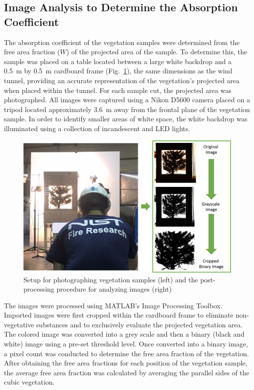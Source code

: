 \documentclass[12pt]{article}
\begin{document}
\subsection{Image Analysis to Determine the Absorption Coefficient }
\label{ssec:headingscap}

The absorption coefficient of the vegetation samples were determined from the free area fraction ($W$) of the projected area of the sample. To determine this, the sample was placed on a table located between a large white backdrop and a 0.5~m by 0.5~m cardboard frame (Fig.~\ref{fig:ImgAnaly}), the same dimensions as the wind tunnel, providing an accurate representation of the vegetation's projected area when placed within the tunnel. For each sample cut, the projected area was photographed. All images were captured using a Nikon D5600 camera placed on a tripod located approximately 3.6~\si{m} away from the frontal plane of the vegetation sample. In order to identify smaller areas of white space, the white backdrop was illuminated using a collection of incandescent and LED lights.

\begin{figure} [!h]
	\centering 	\includegraphics[width=1.0\linewidth]{Picture5.jpg}
	\caption{Setup for photographing vegetation samples (left) and the post-processing procedure for analyzing images (right)}
	\label{fig:ImgAnaly}
\end{figure}

The images were processed using MATLAB's Image Processing Toolbox. Imported images were first cropped within the cardboard frame to eliminate non-vegetative substances and to exclusively evaluate the projected vegetation area. The colored image was converted into a grey scale and then a binary (black and white) image using a pre-set threshold level. Once converted into a binary image, a pixel count was conducted to determine the free area fraction of the vegetation. After obtaining the free area fractions for each position of the vegetation sample, the average free area fraction was calculated by averaging the parallel sides of the cubic vegetation.
\end{document}
